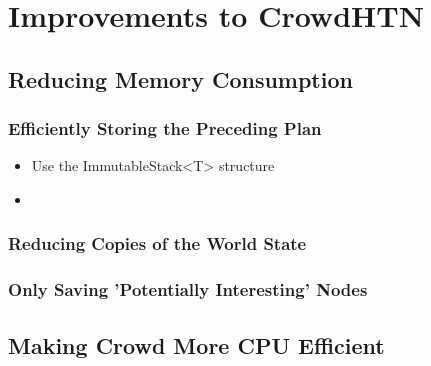 \section{Improvements to CrowdHTN}

\subsection{Reducing Memory Consumption}

\subsubsection{Efficiently Storing the Preceding Plan}
\begin{itemize}
	\item Use the ImmutableStack<T> structure
	\item 
\end{itemize}

\subsubsection{Reducing Copies of the World State}

\subsubsection{Only Saving 'Potentially Interesting' Nodes}

\subsection{Making Crowd More CPU Efficient}

